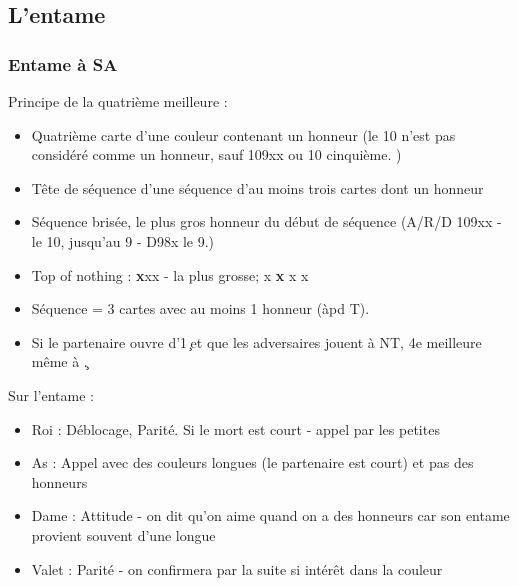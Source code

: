 \documentclass[a4paper]{article}
\begin{document}
\subsection{L'entame}

\subsubsection{Entame à SA}

Principe de la quatrième meilleure :

\begin{itemize}
\item Quatrième carte d'une couleur contenant un honneur (le 10 n'est pas considéré comme un honneur, sauf 109xx ou 10 cinquième. )

\item Tête de séquence d'une séquence d'au moins trois cartes dont un honneur

\item Séquence brisée, le plus gros honneur du début de séquence (A/R/D 109xx - le 10, jusqu'au 9 - D98x le 9.)

\item Top of nothing : \textbf{x}xx - la plus grosse; x \textbf{x} x x

\item Séquence = 3 cartes avec au moins 1 honneur (àpd T).

\item Si le partenaire ouvre d'1\c\ et que les adversaires jouent à NT, 4e meilleure même à \c .

\end{itemize}

Sur l'entame :

\begin{itemize}
\item Roi : Déblocage, Parité. Si le mort est court - appel par les petites

\item As : Appel avec des couleurs longues (le partenaire est court) et pas des honneurs

\item Dame : Attitude - on dit qu’on aime quand on a des honneurs car son entame provient souvent d’une longue

\item Valet : Parité - on confirmera par la suite si intérêt dans la couleur

\end{itemize}
\end{document}
